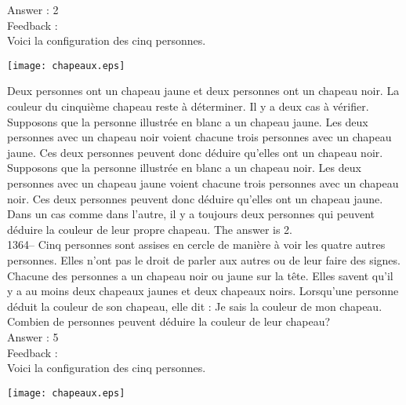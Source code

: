 \documentclass[letterpaper, 12pt]{article}
\begin{document}
Answer : 2\\

Feedback : \\
Voici la configuration des cinq personnes.
    \begin{center}
    \texttt{[image: chapeaux.eps]}
    \end{center}

Deux personnes ont un chapeau jaune et deux personnes ont un chapeau noir.
La couleur du cinqui\`eme chapeau reste \`a d\'eterminer.  Il y a deux cas
\`a v\'erifier.\\

Supposons que la personne illustr\'ee en blanc a un chapeau jaune.  Les deux
personnes avec un chapeau noir voient chacune trois personnes avec un
chapeau jaune.  Ces deux personnes peuvent donc d\'eduire qu'elles ont un
chapeau noir.  \\
Supposons que la personne illustr\'ee en blanc a un chapeau noir.  Les deux
personnes avec un chapeau jaune voient chacune trois personnes avec un
chapeau noir.  Ces deux personnes peuvent donc d\'eduire qu'elles ont un
chapeau jaune.  \\
Dans un cas comme dans l'autre, il y a toujours deux personnes qui peuvent
d\'eduire la couleur de leur propre chapeau.  The answer is 2.\\

1364-- Cinq personnes sont assises en cercle de mani\`ere \`a voir
les quatre autres personnes.  Elles n'ont pas le droit de parler aux
autres ou de leur faire des signes.  Chacune des personnes a un
chapeau noir ou jaune sur la t\^ete.  Elles savent qu'il y a au
moins deux chapeaux jaunes et deux chapeaux noirs.  Lorsqu'une
personne d\'eduit la couleur de son chapeau, elle dit : \og Je sais
la couleur de mon chapeau\fg .  Combien de personnes
peuvent d\'eduire la couleur de leur chapeau?\\

Answer : 5\\

Feedback : \\
Voici la configuration des cinq personnes.
    \begin{center}
    \texttt{[image: chapeaux.eps]}
    \end{center}
\end{document}
